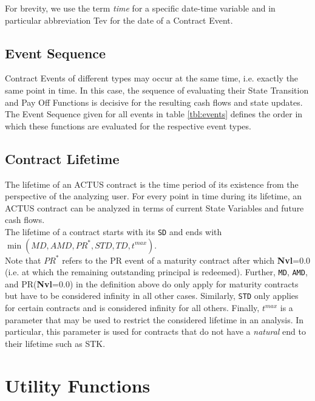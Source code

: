 \documentclass[9pt,oneside]{amsart}
\newcommand{\attr}[1]{\texttt{#1}}
\newcommand{\tmax}{t^{max}}
\begin{document}
\begin{multicols}{2}
For brevity, we use the term \textit{time} for a specific date-time variable and in particular abbreviation Tev for the date of a Contract Event.


\subsection{Event Sequence}

Contract Events of different types may occur at the same time, i.e. exactly the same point in time. In this case, the sequence of evaluating their State Transition and Pay Off Functions is decisive for the resulting cash flows and state updates. The Event Sequence given for all events in table \ref{tbl:events} defines the order in which these functions are evaluated for the respective event types.


\subsection{Contract Lifetime}

The lifetime of an ACTUS contract is the time period of its existence from the perspective of the analyzing user. For every point in time during its lifetime, an ACTUS contract can be analyzed in terms of current State Variables and future cash flows.\\

The lifetime of a contract starts with its \attr{SD} and ends with $\min(MD, AMD, PR^*, STD, TD,\tmax)$.\\

Note that $PR^*$ refers to the PR event of a maturity contract after which \textbf{Nvl}=0.0 (i.e. at which the remaining outstanding principal is redeemed). Further, \attr{MD}, \attr{AMD}, and PR(\textbf{Nvl}=0.0) in the definition above do only apply for maturity contracts but have to be considered infinity in all other cases. Similarly, \attr{STD} only applies for certain contracts and is considered infinity for all others. Finally, $\tmax$ is a parameter that may be used to restrict the considered lifetime in an analysis. In particular, this parameter is used for contracts that do not have a \textit{natural} end to their lifetime such as STK.



\section{Utility Functions}


\end{multicols}
\end{document}
